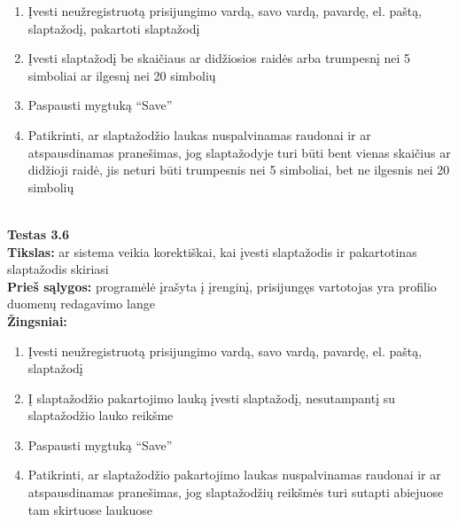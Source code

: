 \documentclass{VUMIFPSkursinis}
\begin{document}
		\begin{enumerate}[noitemsep,topsep=0pt]
			\item Įvesti neužregistruotą prisijungimo vardą, savo vardą, pavardę, el. paštą, slaptažodį, pakartoti slaptažodį
			\item Įvesti slaptažodį be skaičiaus ar didžiosios raidės arba trumpesnį nei 5 simboliai ar ilgesnį nei 20 simbolių
			\item Paspausti mygtuką “Save” 
			\item Patikrinti, ar slaptažodžio laukas nuspalvinamas raudonai ir ar atspausdinamas pranešimas, jog slaptažodyje turi būti bent vienas skaičius ar didžioji raidė, jis neturi būti trumpesnis nei 5 simboliai, bet ne ilgesnis nei 20 simbolių
		\end{enumerate}
		\textbf{}\\
		\textbf{Testas 3.6}\\
		\textbf{Tikslas:} ar sistema veikia korektiškai, kai įvesti slaptažodis ir pakartotinas slaptažodis skiriasi\\
		\textbf{Prieš sąlygos:} programėlė įrašyta į įrenginį, prisijungęs vartotojas yra profilio duomenų redagavimo lange\\
		\textbf{Žingsniai:}
		\begin{enumerate}[noitemsep,topsep=0pt]
			\item Įvesti neužregistruotą prisijungimo vardą, savo vardą, pavardę, el. paštą, slaptažodį
			\item Į slaptažodžio pakartojimo lauką įvesti slaptažodį, nesutampantį su slaptažodžio lauko reikšme
			\item Paspausti mygtuką “Save” 
			\item Patikrinti, ar slaptažodžio pakartojimo laukas nuspalvinamas raudonai ir ar atspausdinamas pranešimas, jog slaptažodžių reikšmės turi sutapti abiejuose tam skirtuose laukuose
		\end{enumerate}
\end{document}
